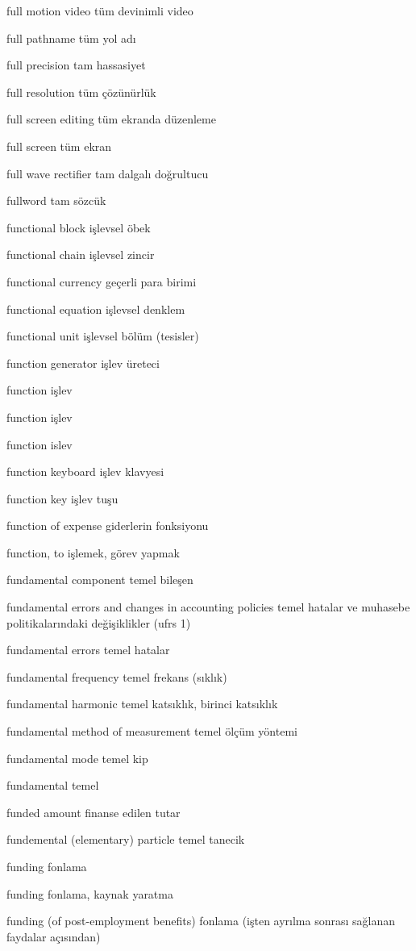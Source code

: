 \documentclass[12pt,fleqn]{article}\usepackage{../../common}
\begin{document}
full motion video tüm devinimli video

full pathname tüm yol adı

full precision tam hassasiyet

full resolution tüm çözünürlük

full screen editing tüm ekranda düzenleme

full screen tüm ekran

full wave rectifier tam dalgalı doğrultucu

fullword tam sözcük

functional block işlevsel öbek

functional chain işlevsel zincir

functional currency geçerli para birimi

functional equation işlevsel denklem

functional unit işlevsel bölüm (tesisler)

function generator işlev üreteci

function işlev

function işlev

function islev

function keyboard işlev klavyesi

function key işlev tuşu

function of expense giderlerin fonksiyonu

function, to işlemek, görev yapmak

fundamental component temel bileşen

fundamental errors and changes in accounting policies temel hatalar ve muhasebe politikalarındaki değişiklikler (ufrs 1)

fundamental errors temel hatalar

fundamental frequency temel frekans (sıklık)

fundamental harmonic temel katsıklık, birinci katsıklık

fundamental method of measurement temel ölçüm yöntemi

fundamental mode temel kip

fundamental temel

funded amount finanse edilen tutar

fundemental (elementary) particle temel tanecik

funding fonlama

funding fonlama, kaynak yaratma

funding (of post-employment benefits) fonlama (işten ayrılma sonrası sağlanan faydalar açısından)
\end{document}
